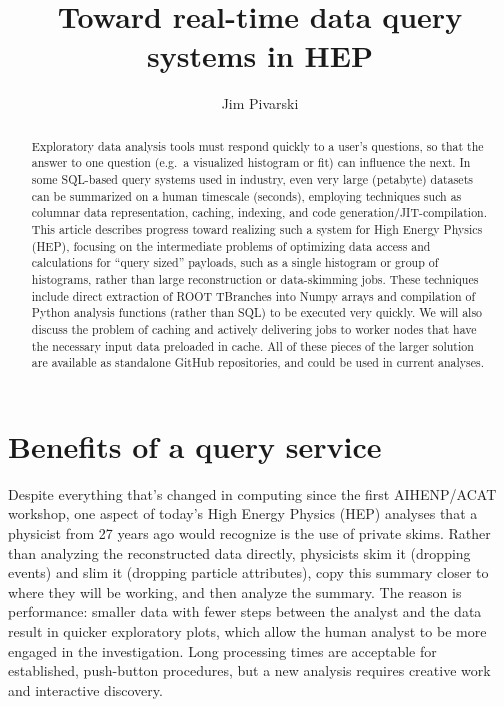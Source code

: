 \documentclass[a4paper]{jpconf}
\begin{document}
\title{Toward real-time data query systems in HEP}

\author{Jim Pivarski}

\address{147 N.\ Ridgeland Ave.\ Unit 3S, Oak Park, IL 60302, US}


\begin{abstract}
Exploratory data analysis tools must respond quickly to a user's questions, so that the answer to one question (e.g.\ a visualized histogram or fit) can influence the next. In some SQL-based query systems used in industry, even very large (petabyte) datasets can be summarized on a human timescale (seconds), employing techniques such as columnar data representation, caching, indexing, and code generation/JIT-compilation. This article describes progress toward realizing such a system for High Energy Physics (HEP), focusing on the intermediate problems of optimizing data access and calculations for ``query sized'' payloads, such as a single histogram or group of histograms, rather than large reconstruction or data-skimming jobs. These techniques include direct extraction of ROOT TBranches into Numpy arrays and compilation of Python analysis functions (rather than SQL) to be executed very quickly. We will also discuss the problem of caching and actively delivering jobs to worker nodes that have the necessary input data preloaded in cache. All of these pieces of the larger solution are available as standalone GitHub repositories, and could be used in current analyses.
\end{abstract}

\section{Benefits of a query service}

Despite everything that's changed in computing since the first AIHENP/ACAT workshop, one aspect of today's High Energy Physics (HEP) analyses that a physicist from 27 years ago would recognize is the use of private skims. Rather than analyzing the reconstructed data directly, physicists skim it (dropping events) and slim it (dropping particle attributes), copy this summary closer to where they will be working, and then analyze the summary. The reason is performance: smaller data with fewer steps between the analyst and the data result in quicker exploratory plots, which allow the human analyst to be more engaged in the investigation. Long processing times are acceptable for established, push-button procedures, but a new analysis requires creative work and interactive discovery.
\end{document}
